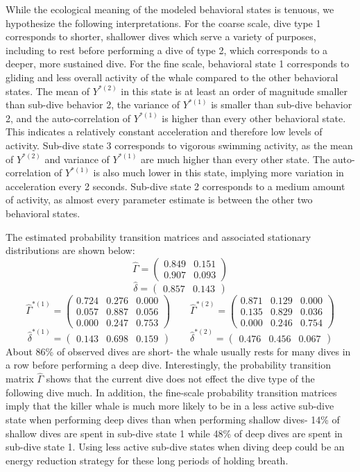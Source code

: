 %
While the ecological meaning of the modeled behavioral states is tenuous, we hypothesize the following interpretations. For the coarse scale, dive type 1 corresponds to shorter, shallower dives which serve a variety of purposes, including to rest before performing a dive of type 2, which corresponds to a deeper, more sustained dive. For the fine scale, behavioral state 1 corresponds to gliding and less overall activity of the whale compared to the other behavioral states. The mean of $Y^{*(2)}$ in this state is at least an order of magnitude smaller than sub-dive behavior 2, the variance of $Y^{*(1)}$ is smaller than sub-dive behavior 2, and the auto-correlation of $Y^{*(1)}$ is higher than every other behavioral state. This indicates a relatively constant acceleration and therefore low levels of activity. Sub-dive state 3 corresponds to vigorous swimming activity, as the mean of $Y^{*(2)}$ and variance of $Y^{*(1)}$ are much higher than every other state. The auto-correlation of $Y^{*(1)}$ is also much lower in this state, implying more variation in acceleration every 2 seconds. Sub-dive state 2 corresponds to a medium amount of activity, as almost every parameter estimate is between the other two behavioral states.

The estimated probability transition matrices and associated stationary distributions are shown below:
%
$$\hat \Gamma = \begin{pmatrix} 
0.849 & 0.151 \\
0.907 & 0.093
\end{pmatrix}$$
$$\hat \delta = \begin{pmatrix} 0.857 & 0.143 \end{pmatrix}$$
%
$$\hat \Gamma^{*(1)} = \begin{pmatrix} 
0.724 & 0.276 & 0.000 \\
0.057 & 0.887 & 0.056 \\
0.000 & 0.247 & 0.753
\end{pmatrix} \qquad 
\hat \Gamma^{*(2)} = \begin{pmatrix} 
0.871 & 0.129 & 0.000 \\
0.135 & 0.829 & 0.036 \\
0.000 & 0.246 & 0.754
\end{pmatrix}$$
$$\hat \delta^{*(1)} = \begin{pmatrix} 0.143 & 0.698 & 0.159 \end{pmatrix} \qquad
\hat \delta^{*(2)} = \begin{pmatrix} 0.476 & 0.456 & 0.067 \end{pmatrix}$$
%
About 86\% of observed dives are short- the whale usually rests for many dives in a row before performing a deep dive. Interestingly, the probability transition matrix $\hat \Gamma$ shows that the current dive does not effect the dive type of the following dive much. In addition, the fine-scale probability transition matrices imply that the killer whale is much more likely to be in a less active sub-dive state when performing deep dives than when performing shallow dives- 14\% of shallow dives are spent in sub-dive state 1 while 48\% of deep dives are spent in sub-dive state 1. Using less active sub-dive states when diving deep could be an energy reduction strategy for these long periods of holding breath.

